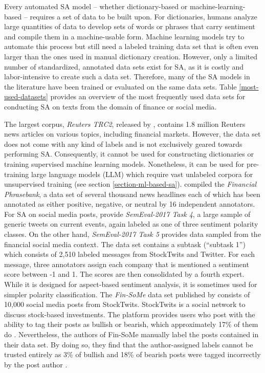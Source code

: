 Every automated SA model -- whether dictionary-based or machine-learning-based -- requires a set of data to be built upon. For dictionaries, humans analyze large quantities of data to develop sets of words or phrases that carry sentiment and compile them in a machine-usable form. Machine learning models try to automate this process but still need a labeled training data set that is often even larger than the ones used in manual dictionary creation. However, only a limited number of standardized, annotated data sets exist for SA, as it is costly and labor-intensive to create such a data set. Therefore, many of the SA models in the literature have been trained or evaluated on the same data sets. Table \ref{most-used-datasets} provides an overview of the most frequently used data sets for conducting SA on texts from the domain of finance or social media.



The largest corpus, \emph{Reuters TRC2}, released by , contains 1.8 million Reuters news articles on various topics, including financial markets. However, the data set does not come with any kind of labels and is not exclusively geared towards performing SA. Consequently, it cannot be used for constructing dictionaries or training supervised machine learning models. Nonetheless, it can be used for pre-training large language models (LLM) which require vast unlabeled corpora for unsupervised training (see section \ref{section-ml-based-sa}).  compiled the \emph{Financial Phrasebank}, a data set of several thousand news headlines each of which has been annotated as either positive, negative, or neutral by 16 independent annotators. For SA on social media posts,  provide \emph{SemEval-2017 Task 4}, a large sample of generic tweets on current events, again labeled as one of three sentiment polarity classes. On the other hand, \emph{SemEval-2017 Task 5}  provides data sampled from the financial social media context. The data set contains a subtask (``subtask 1'') which consists of 2,510 labeled messages from StockTwits and Twitter. For each message, three annotators assign each company that is mentioned a sentiment score between -1 and 1. The scores are then consolidated by a fourth expert. While it is designed for aspect-based sentiment analysis, it is sometimes used for simpler polarity classification. The \emph{Fin-SoMe} data set published by  consists of 10,000 social media posts from StockTwits. StockTwits is a social network to discuss stock-based investments. The platform provides users who post with the ability to tag their posts as bullish or bearish, which approximately 17\% of them do . Nevertheless, the authors of Fin-SoMe manually label the posts contained in their data set. By doing so, they find that the author-assigned labels cannot be trusted entirely as 3\% of bullish and 18\% of bearish posts were tagged incorrectly by the post author .

